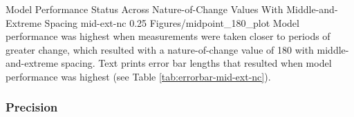 \documentclass[
12pt, %
twoside,
english]{guelphthesis}
\begin{document}
\begin{apaFigure}
[portrait]
[samepage]
[0cm]
{Model Performance Status Across Nature-of-Change Values With Middle-and-Extreme Spacing}
{mid-ext-nc}
{0.25}
{Figures/midpoint_180_plot}
{Model performance was highest when measurements were taken closer to periods of greater change, which resulted with a nature-of-change value of 180 with middle-and-extreme spacing. Text prints error bar lengths that resulted when model performance was highest (see Table \ref{tab:errorbar-mid-ext-nc}).}
\end{apaFigure}
\hypertarget{precision-mid-ext-exp1}{%
\subsubsection{Precision}\label{precision-mid-ext-exp1}}
\end{document}
